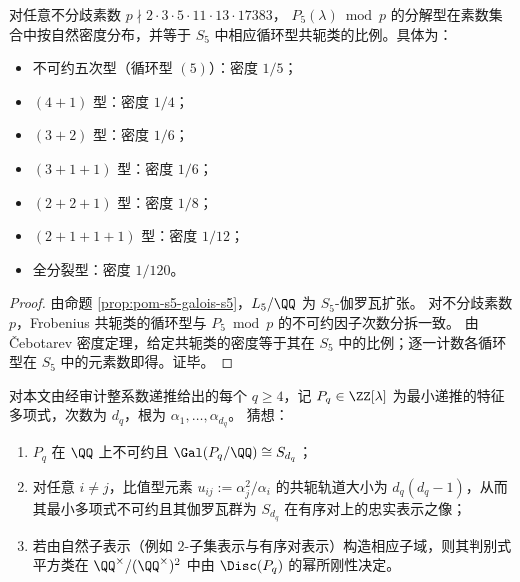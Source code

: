 \begin{corollary}\label{cor:pom-s5-chebotarev-splitting-density}
对任意不分歧素数
\(
p\nmid 2\cdot 3\cdot 5\cdot 11\cdot 13\cdot 17383
\)，
\(P_5(\lambda)\bmod p\) 的分解型在素数集合中按自然密度分布，并等于 \(S_5\) 中相应循环型共轭类的比例。具体为：
\begin{itemize}
  \item 不可约五次型（循环型 \((5)\)）：密度 \(1/5\)；
  \item \((4+1)\) 型：密度 \(1/4\)；
  \item \((3+2)\) 型：密度 \(1/6\)；
  \item \((3+1+1)\) 型：密度 \(1/6\)；
  \item \((2+2+1)\) 型：密度 \(1/8\)；
  \item \((2+1+1+1)\) 型：密度 \(1/12\)；
  \item 全分裂型：密度 \(1/120\)。
\end{itemize}
\end{corollary}
\begin{proof}
由命题 \ref{prop:pom-s5-galois-s5}，\(L_5/\QQ\) 为 \(S_5\)-伽罗瓦扩张。
对不分歧素数 \(p\)，Frobenius 共轭类的循环型与 \(P_5\bmod p\) 的不可约因子次数分拆一致。
由 Čebotarev 密度定理，给定共轭类的密度等于其在 \(S_5\) 中的比例；逐一计数各循环型在 \(S_5\) 中的元素数即得。证毕。
\end{proof}

\begin{conjecture}[碰撞矩特征域与比值域的满对称性]\label{conj:pom-moment-charpoly-ratio-full-symmetric}
对本文由经审计整系数递推给出的每个 \(q\ge 4\)，记 \(P_q\in\ZZ[\lambda]\) 为最小递推的特征多项式，次数为 \(d_q\)，根为 \(\alpha_1,\dots,\alpha_{d_q}\)。
猜想：
\begin{enumerate}
  \item \(P_q\) 在 \(\QQ\) 上不可约且 \(\Gal(P_q/\QQ)\cong S_{d_q}\)；
  \item 对任意 \(i\neq j\)，比值型元素 \(u_{ij}:=\alpha_j^2/\alpha_i\) 的共轭轨道大小为 \(d_q(d_q-1)\)，从而其最小多项式不可约且其伽罗瓦群为 \(S_{d_q}\) 在有序对上的忠实表示之像；
  \item 若由自然子表示（例如 \(2\)-子集表示与有序对表示）构造相应子域，则其判别式平方类在 \(\QQ^\times/(\QQ^\times)^2\) 中由 \(\Disc(P_q)\) 的幂所刚性决定。
\end{enumerate}
\end{conjecture}
